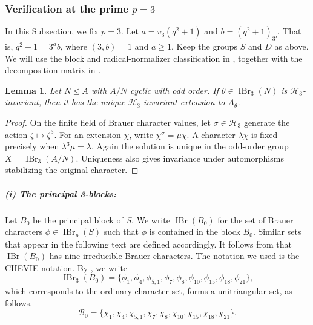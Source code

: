 \documentclass[11pt,a4paper]{article}
\numberwithin{equation}{section}
\newtheorem{lemma}[theorem]{Lemma}
\theoremstyle{definition}
\theoremstyle{remark}
\newcommand{\IBr}{\operatorname{IBr}}
\newcommand{\HH}{\mathcal H}
\begin{document}
\subsubsection{Verification at the prime \texorpdfstring{$p=3$}{p=3}}\label{p=3}

In this Subsection, we fix $p=3$. Let $a=v_3(q^2+1)$ and $b=(q^2+1)_{3'}$. That is, $q^2+1=3^a b$, where $(3,b)=1$ and $a\geq 1$.
Keep the groups $S$ and $D$ as above. We will use the block and radical-normalizer classification in \cite[Tables~3--4 and the following discussion]{Malle}, together with the decomposition matrix in \cite[Section 4]{Himstedt}.

\begin{lemma}\label{lem:h3}
Let $N\unlhd A$ with $A/N$ cyclic with odd order.
If $\theta\in\IBr_3(N)$ is $\HH_3$-invariant, then it has the unique $\HH_3$-invariant extension to $A_\theta$.
\end{lemma}
\begin{proof}
On the finite field of Brauer character values, let $\sigma\in\HH_3$ generate the action $\zeta\mapsto\zeta^3$. For an extension $\chi$, write $\chi^\sigma=\mu\chi$. A character $\lambda\chi$ is fixed precisely when $\lambda^3\mu=\lambda$.
Again the solution is unique in the odd-order group $X=\IBr_3(A/N)$. Uniqueness also gives invariance under automorphisms stabilizing the original character.
\end{proof}


\subparagraph{(i) The principal 3-blocks:}
Let $B_0$ be the principal block of $S$. We write $\IBr(B_0)$ for 
the set of Brauer characters $\phi\in\IBr_p(S)$ such that $\phi$ is contained in the block $B_0$. Similar sets that appear in the following text are defined accordingly.
It follows from  \cite[first row of Table~3]{Malle} that  $\IBr(B_0)$ has nine irreducible Brauer characters. The notation we used is the CHEVIE notation. By \cite[Section 4 and Table~C.5]{Himstedt}, we write 
\begin{equation}
\IBr_3(B_0)=\{\phi_1,\phi_4,\phi_{5,1},\phi_7,\phi_8,\phi_{10},\phi_{15},\phi_{18},\phi_{21}\},
\end{equation}
which corresponds to the ordinary character set, forms a unitriangular set, as follows.
\begin{equation}\label{principal 3-block}
\mathcal{B}_0=\{\chi_1,\chi_4,\chi_{5,1},\chi_7,\chi_8,\chi_{10},\chi_{15},\chi_{18},\chi_{21}\}.
\end{equation}
\end{document}
